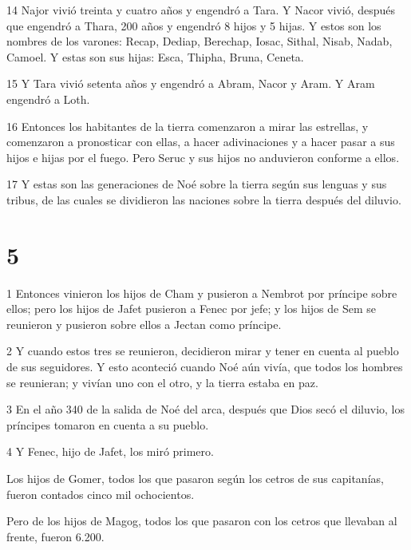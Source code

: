 \par 14 Najor vivió treinta y cuatro años y engendró a Tara. Y Nacor vivió, después que engendró a Thara, 200 años y engendró 8 hijos y 5 hijas. Y estos son los nombres de los varones: Recap, Dediap, Berechap, Iosac, Sithal, Nisab, Nadab, Camoel. Y estas son sus hijas: Esca, Thipha, Bruna, Ceneta.

\par 15 Y Tara vivió setenta años y engendró a Abram, Nacor y Aram. Y Aram engendró a Loth.

\par 16 Entonces los habitantes de la tierra comenzaron a mirar las estrellas, y comenzaron a pronosticar con ellas, a hacer adivinaciones y a hacer pasar a sus hijos e hijas por el fuego. Pero Seruc y sus hijos no anduvieron conforme a ellos.

\par 17 Y estas son las generaciones de Noé sobre la tierra según sus lenguas y sus tribus, de las cuales se dividieron las naciones sobre la tierra después del diluvio.

\chapter{5}

\par 1 Entonces vinieron los hijos de Cham y pusieron a Nembrot por príncipe sobre ellos; pero los hijos de Jafet pusieron a Fenec por jefe; y los hijos de Sem se reunieron y pusieron sobre ellos a Jectan como príncipe.

\par 2 Y cuando estos tres se reunieron, decidieron mirar y tener en cuenta al pueblo de sus seguidores. Y esto aconteció cuando Noé aún vivía, que todos los hombres se reunieran; y vivían uno con el otro, y la tierra estaba en paz.

\par 3 En el año 340 de la salida de Noé del arca, después que Dios secó el diluvio, los príncipes tomaron en cuenta a su pueblo.

\par 4 Y Fenec, hijo de Jafet, los miró primero.

\par Los hijos de Gomer, todos los que pasaron según los cetros de sus capitanías, fueron contados cinco mil ochocientos.

\par Pero de los hijos de Magog, todos los que pasaron con los cetros que llevaban al frente, fueron 6.200.


